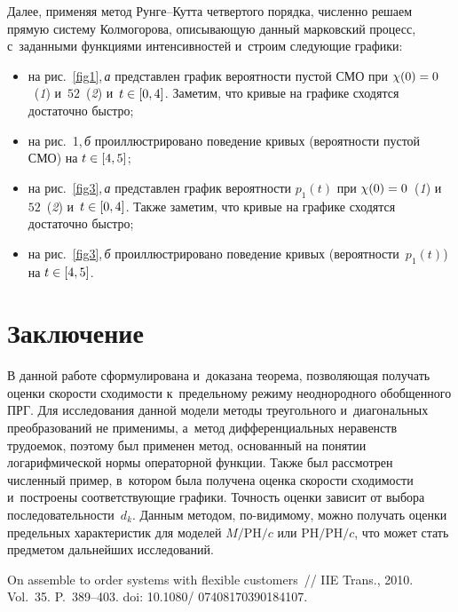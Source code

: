 \begin{multicols}{2}
Далее, применяя метод Рун\-ге--Кут\-та чет\-вер\-то\-го порядка, чис\-лен\-но 
решаем прямую сис\-те\-му Колмогорова, опи\-сы\-ва\-ющую данный марковский процесс, 
с~заданными функциями интенсивностей и~стро\-им сле\-ду\-ющие гра\-фики:
\begin{itemize}
    \item на рис.~\ref{fig1},\,\textit{а} пред\-став\-лен график ве\-ро\-ят\-ности пус\-той СМО при 
$\chi(0) \hm= 0$~(\textit{1}) и~$52$~(\textit{2}) и~$t \hm\in 
[0,4]$. Заметим, что кривые на графике сходятся достаточно \mbox{быстро};
    \item на рис.~1,\,\textit{б} про\-ил\-люст\-ри\-ро\-ва\-но поведение кривых (вероятности 
пус\-той СМО) на $t \hm\in [4,5]$;
    \item на рис.~\ref{fig3},\,\textit{а} пред\-став\-лен график ве\-ро\-ят\-ности $p_1(t)$ при  
$\chi(0) \hm= 0$~(\textit{1}) и~$52$~(\textit{2}) и~$t \hm\in 
[0,4]$. Так\-же заметим, что кривые на графике сходятся достаточно \mbox{быстро};
    \item на рис.~\ref{fig3},\,\textit{б} про\-ил\-люст\-ри\-ро\-ва\-но поведение кривых (вероятности~$p_1(t)$) на $t \hm\in [4,5]$.
\end{itemize}


\vspace*{-7pt}


\section{Заключение}

\vspace*{-1pt}

В данной работе сформулирована и~доказана тео\-ре\-ма, поз\-во\-ля\-ющая получать оценки 
ско\-рости схо\-ди\-мости к~предельному режиму неоднородного обобщенного 
ПРГ. Для исследования данной модели методы треугольного 
и~диагональных преобразований не применимы, а~метод дифференциальных неравенств 
трудоемок, поэтому был применен метод, основанный на понятии логарифмической 
нор\-мы операторной функции. Так\-же был рас\-смот\-рен чис\-лен\-ный пример, в~котором 
была получена оценка ско\-рости схо\-ди\-мо\-сти и~построены со\-от\-вет\-ст\-ву\-ющие графики. 
Точ\-ность оцен\-ки зависит от выбора по\-сле\-до\-ва\-тель\-ности~$d_k$. Данным методом, по-ви\-ди\-мо\-му, 
мож\-но получать оцен\-ки предельных характеристик для моделей $M/\mathrm{PH}/c$ 
или $\mathrm{PH}/\mathrm{PH}/c$, что  может стать пред\-ме\-том дальнейших исследований.


{\small\frenchspacing
 { %
 \begin{thebibliography}{99}   
On assemble to order systems with flexible customers~// IIE Trans., 2010. Vol.~35. P.~389--403.
doi: 10.1080/ 07408170390184107.


\end{thebibliography}}}
\end{multicols}
